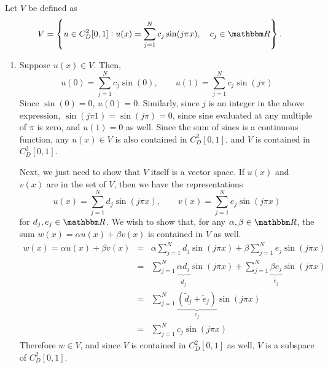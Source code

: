 \begin{solution}

Let $V$ be defined as
\[
V = \left\{ u\in C_D^2[0,1]: u(x) = \sum_{j = 1}^N c_j \sin( j \pi x), \quad c_j \in \R \right\}.
\]
\begin{enumerate}
\item Suppose $u(x) \in V$.  Then, 
\[
u(0) =  \sum_{j = 1}^N c_j \sin( 0), \qquad  u(1) = \sum_{j = 1}^N c_j \sin( j \pi )
\]
Since $\sin(0) = 0$, $u(0) = 0$.  Similarly, since $j$ is an integer in the above expression, $\sin(j\pi 1) = \sin(j\pi) = 0$, since sine evaluated at any multiple of $\pi$ is zero, and $u(1) = 0$ as well.  Since the sum of sines is a continuous function, any $u(x)\in V$ is also contained in $C^2_D[0,1]$, and $V$ is contained in $C^2_D[0,1]$.  
 
 
Next, we just need to show that $V$ itself is a vector space.  If $u(x)$ and $v(x)$ are in the set of $V$, then we have the representations
\[
u(x)= \sum_{j = 1}^N d_j \sin( j \pi x), \qquad v(x)= \sum_{j = 1}^N e_j \sin( j \pi x)
\]
for $d_j, e_j \in \R$.  We wish to show that, for any $\alpha, \beta \in \R$, the sum $w(x) = \alpha u(x) +\beta v(x)$ is contained in $V$ as well.  
\begin{eqnarray*}
w(x)= \alpha u(x) +\beta v(x)&=& \alpha \sum_{j = 1}^N d_j \sin( j \pi x) + \beta \sum_{j = 1}^N e_j \sin( j \pi x)\\
&=& \sum_{j = 1}^N \underbrace{\alpha d_j}_{\tilde{d}_j} \sin( j \pi x) + \sum_{j = 1}^N \underbrace{\beta e_j}_{\tilde{e}_j} \sin( j \pi x)\\
&=& \sum_{j = 1}^N \underbrace{(\tilde{d}_j + \tilde{e}_j)}_{c_j} \sin( j \pi x)\\
&=& \sum_{j = 1}^N c_j \sin( j \pi x) 
\end{eqnarray*}
Therefore $w \in V$, and since $V$ is contained in $C^2_D[0,1]$ as well, $V$ is a subspace of $C_D^2[0,1]$.


\end{enumerate}
\end{solution}
